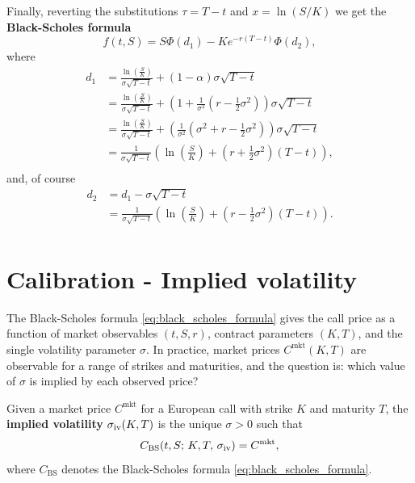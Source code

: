 Finally, reverting the substitutions $\tau = T - t$ and $x = \ln(S/K)$ we get the \textbf{Black-Scholes formula}
\begin{equation} \label{eq:black_scholes_formula}
    f(t, S) = S \Phi(d_1) - K e^{-r (T - t)} \Phi(d_2),
\end{equation}
where
\begin{equation*}
\begin{aligned}
    d_1 
        & = \frac{\ln{\left( \frac{S}{K} \right)}}{\sigma \sqrt{T - t}} + (1 - \alpha) \sigma \sqrt{T - t} \\
        & = \frac{\ln{\left( \frac{S}{K} \right)}}{\sigma \sqrt{T - t}} + \left(1 + \frac{1}{\sigma^2}\left(r - \frac{1}{2} \sigma^2\right)\right) \sigma \sqrt{T - t} \\
        & = \frac{\ln{\left( \frac{S}{K} \right)}}{\sigma \sqrt{T - t}} + \left(\frac{1}{\sigma^2}\left(\sigma^2 + r - \frac{1}{2} \sigma^2\right)\right) \sigma \sqrt{T - t} \\
        & = \frac{1}{\sigma \sqrt{T - t}} \left( \ln{\left( \frac{S}{K} \right)} + \left( r + \frac{1}{2} \sigma^2 \right) (T - t) \right), \\
\end{aligned}
\end{equation*}
and, of course
\begin{equation*}
\begin{aligned}
    d_2 
        & = d_1 - \sigma \sqrt{T - t} \\
        & = \frac{1}{\sigma \sqrt{T - t}} \left( \ln{\left( \frac{S}{K} \right)} + \left( r - \frac{1}{2} \sigma^2 \right) (T - t) \right). \\
\end{aligned}
\end{equation*}


\section{Calibration - Implied volatility}

The Black-Scholes formula \eqref{eq:black_scholes_formula} gives the call price as a function of
market observables $(t, S, r)$, contract parameters $(K, T)$, and the single volatility parameter $\sigma$.
In practice, market prices $C^{\mathrm{mkt}}(K, T)$ are observable for a range of strikes and maturities,
and the question is: which value of $\sigma$ is implied by each observed price?

\begin{definition}
    Given a market price $C^{\mathrm{mkt}}$ for a European call with strike $K$ and maturity $T$,
    the \textbf{implied volatility} $\sigma_{\mathrm{iv}}(K, T)$ is the unique $\sigma > 0$ such that
    \begin{equation}\label{eq:implied_vol}
        C_{\mathrm{BS}}\!\left(t, S;\, K, T,\, \sigma_{\mathrm{iv}}\right) = C^{\mathrm{mkt}},
    \end{equation}
    where $C_{\mathrm{BS}}$ denotes the Black-Scholes formula \eqref{eq:black_scholes_formula}.
\end{definition}

